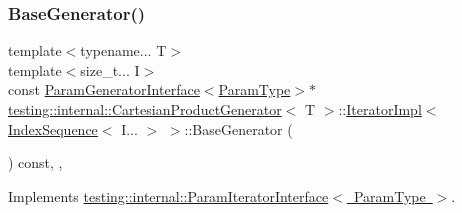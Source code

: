 \subsubsection{\texorpdfstring{BaseGenerator()}{BaseGenerator()}\hspace{0.1cm}{\footnotesize\ttfamily [1/2]}}
{\footnotesize\ttfamily template$<$typename... T$>$ \\
template$<$size\+\_\+t... I$>$ \\
const \mbox{\hyperlink{classtesting_1_1internal_1_1_param_generator_interface}{Param\+Generator\+Interface}}$<$\mbox{\hyperlink{classtesting_1_1internal_1_1_cartesian_product_generator_af27131157a9347f0c82420ca081ee7dd}{Param\+Type}}$>$$\ast$ \mbox{\hyperlink{classtesting_1_1internal_1_1_cartesian_product_generator}{testing\+::internal\+::\+Cartesian\+Product\+Generator}}$<$ T $>$\+::\mbox{\hyperlink{classtesting_1_1internal_1_1_cartesian_product_generator_1_1_iterator_impl}{Iterator\+Impl}}$<$ \mbox{\hyperlink{structtesting_1_1internal_1_1_index_sequence}{Index\+Sequence}}$<$ I... $>$ $>$\+::Base\+Generator (\begin{DoxyParamCaption}{ }\end{DoxyParamCaption}) const\hspace{0.3cm}{\ttfamily [inline]}, {\ttfamily [override]}, {\ttfamily [virtual]}}



Implements \mbox{\hyperlink{classtesting_1_1internal_1_1_param_iterator_interface_a17500953df75ecda1ace46c08ff731e9}{testing\+::internal\+::\+Param\+Iterator\+Interface$<$ Param\+Type $>$}}.

\mbox{\label{classtesting_1_1internal_1_1_cartesian_product_generator_1_1_iterator_impl_3_01_index_sequence_3_01_i_8_8_8_01_4_01_4_a8fa3ea322a1348fc8065481aba76e860}} 
